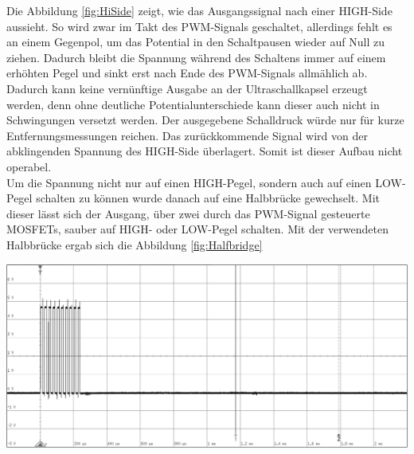 Die Abbildung \ref{fig:HiSide} zeigt, wie das Ausgangssignal nach einer HIGH-Side aussieht. So wird zwar im Takt des PWM-Signals geschaltet, allerdings fehlt es an einem Gegenpol, um das Potential in den Schaltpausen wieder auf Null zu ziehen. Dadurch bleibt die Spannung während des Schaltens immer auf einem erhöhten Pegel und sinkt erst nach Ende des PWM-Signals allmählich ab. Dadurch kann keine vernünftige Ausgabe an der Ultraschallkapsel erzeugt werden, denn ohne deutliche Potentialunterschiede kann dieser auch nicht in Schwingungen versetzt werden. Der ausgegebene Schalldruck würde nur für kurze Entfernungsmessungen reichen. Das zurückkommende Signal wird von der abklingenden Spannung des HIGH-Side überlagert. Somit ist dieser Aufbau nicht operabel.\\
Um die Spannung nicht nur auf einen HIGH-Pegel, sondern auch auf einen LOW-Pegel schalten zu können wurde danach auf eine Halbbrücke gewechselt. Mit dieser lässt sich der Ausgang, über zwei durch das PWM-Signal gesteuerte MOSFETs, sauber auf HIGH- oder LOW-Pegel schalten. %
Mit der verwendeten Halbbrücke ergab sich die Abbildung \ref{fig:Halfbridge}\\
\begin{minipage}{0.5\textwidth}
\includegraphics[width=1\textwidth%
]{Abbildungen/MessungenP1/PWM-Nach-der-Halbbrucke.png}
\label{fig:Halfbridge}
\end{minipage}
